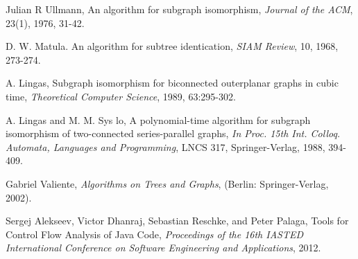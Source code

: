 
%
%
%
\begin{thebibliography}{1}

Julian R   Ullmann, An algorithm for subgraph isomorphism, {\it Journal of the ACM}, 23(1),
    1976, 31-42.

D. W. Matula. An algorithm for subtree identication, {\it SIAM Review},  10, 1968, 273-274.

A. Lingas, Subgraph isomorphism for biconnected outerplanar graphs in cubic time, {\it Theoretical Computer Science}, 
1989, 63:295-302.

A. Lingas and M. M. Sys lo, A polynomial-time algorithm for subgraph isomorphism 
of two-connected series-parallel graphs, {\it In Proc. 15th Int. Colloq. Automata, Languages and Programming}, LNCS 317,  Springer-Verlag, 1988, 394-409.

Gabriel Valiente, {\em Algorithms on Trees and Graphs}, (Berlin: Springer-Verlag, 2002). %
  
Sergej Alekseev, Victor Dhanraj, Sebastian Reschke, and Peter Palaga,
Tools for Control Flow Analysis of Java Code, {\it Proceedings of the 16th IASTED International Conference on Software Engineering and Applications}, 2012.

\end{thebibliography}